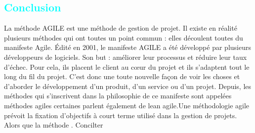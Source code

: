 
\begin{flushleft}
	\section*{\textcolor{cyan}{Conclusion}}
	La méthode AGILE est une méthode de gestion de projet. Il existe en réalité plusieurs méthodes qui ont toutes un point commun : elles découlent toutes du manifeste Agile. Édité en 2001, le manifeste AGILE a été développé par plusieurs développeurs de logiciels. Son but : améliorer leur processus et réduire leur taux d'échec. Pour cela, ils placent le client au cœur du projet et ils s'adaptent tout le long du fil du projet. C'est donc une toute nouvelle façon de voir les choses et d'aborder le développement d'un produit, d'un service ou d'un projet. Depuis, les méthodes qui s'inscrivent dans la philosophie de ce manifeste sont appelées méthodes agiles certaines parlent également de lean agile.\newline	Une méthodologie agile prévoit la fixation d’objectifs à court terme utilisé dans la gestion de projets. Alors que la méthode  .
	Concilter \cite{Doe2018}
\end{flushleft}

\newpage
